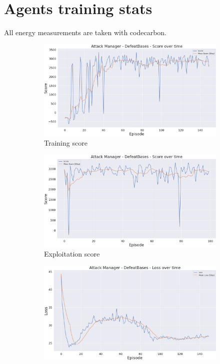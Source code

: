 \chapter{Agents training stats}
\label{app:stats}

All energy measurements are taken with codecarbon.

\begin{figure}[h]
    \centering
    \begin{subfigure}[b]{0.495\textwidth}
        \includegraphics[width=1\textwidth]{figs/multi_dqn_army_attack_manager/score.png}
        \caption{Training score}
    \end{subfigure}
    \begin{subfigure}[b]{0.495\textwidth}
        \includegraphics[width=1\textwidth]{figs/multi_dqn_army_attack_manager/exploit/score.png}
        \caption{Exploitation score}
    \end{subfigure}
    \begin{subfigure}[b]{0.495\textwidth}
        \includegraphics[width=1\textwidth]{figs/multi_dqn_army_attack_manager/loss.png}

\end{subfigure}
\end{figure}
